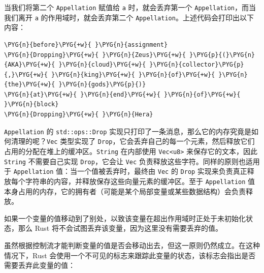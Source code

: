 当我们将第二个 \texttt{Appellation} 赋值给 \texttt{a} 时，就会丢弃第一个 \texttt{Appellation}，而当我们离开 \texttt{a} 的作用域时，就会丢弃第二个 \texttt{Appellation}。上述代码会打印出以下内容：

\begin{Verbatim}[commandchars=\\\{\},breaklines=true,breakanywhere=true,fontsize=\codefont,xleftmargin=17bp]
\PYG{n}{before}\PYG{+w}{ }\PYG{n}{assignment}
\PYG{n}{Dropping}\PYG{+w}{ }\PYG{n}{Zeus}\PYG{+w}{ }\PYG{p}{(}\PYG{n}{AKA}\PYG{+w}{ }\PYG{n}{cloud}\PYG{+w}{ }\PYG{n}{collector}\PYG{p}{,}\PYG{+w}{ }\PYG{n}{king}\PYG{+w}{ }\PYG{n}{of}\PYG{+w}{ }\PYG{n}{the}\PYG{+w}{ }\PYG{n}{gods}\PYG{p}{)}
\PYG{n}{at}\PYG{+w}{ }\PYG{n}{end}\PYG{+w}{ }\PYG{n}{of}\PYG{+w}{ }\PYG{n}{block}
\PYG{n}{Dropping}\PYG{+w}{ }\PYG{n}{Hera}
\end{Verbatim}

\texttt{Appellation} 的 \texttt{std::ops::Drop} 实现只打印了一条消息，那么它的内存究竟是如何清理的呢？\texttt{Vec} 类型实现了 \texttt{Drop}，它会丢弃自己的每一个元素，然后释放它们占用的分配在堆上的缓冲区。\texttt{String} 在内部使用 \texttt{Vec<u8>} 来保存它的文本，因此 \texttt{String} 不需要自己实现 \texttt{Drop}，它会让 \texttt{Vec} 负责释放这些字符。同样的原则也适用于 \texttt{Appellation} 值：当一个值被丢弃时，最终由 \texttt{Vec} 的 \texttt{Drop} 实现来负责真正释放每个字符串的内容，并释放保存这些向量元素的缓冲区。至于 \texttt{Appellation} 值本身占用的内存，它的拥有者（可能是某个局部变量或某些数据结构）会负责释放。

如果一个变量的值移动到了别处，以致该变量在超出作用域时正处于未初始化状态，那么 Rust 将不会试图丢弃该变量，因为这里没有需要丢弃的值。

虽然根据控制流才能判断变量的值是否会移动出去，但这一原则仍然成立。在这种情况下，Rust 会使用一个不可见的标志来跟踪此变量的状态，该标志会指出是否需要丢弃此变量的值：

